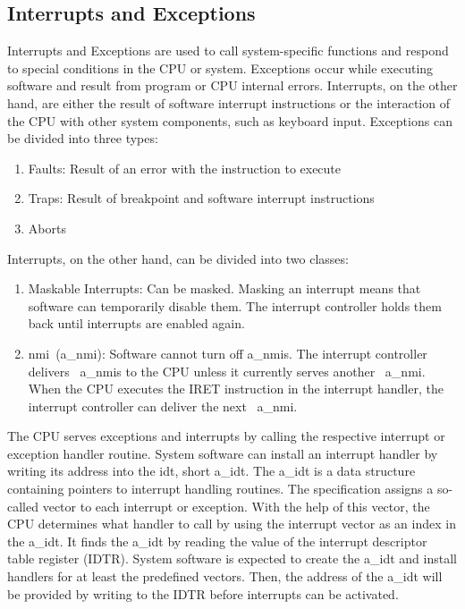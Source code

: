 \subsection{Interrupts and Exceptions}
\label{sec:state:technical:interrupts}
Interrupts and Exceptions are used to call system-specific functions and respond
to special conditions in the CPU or system. Exceptions occur while executing
software and result from program or CPU internal errors. Interrupts, on the
other hand, are either the result of software interrupt instructions or the
interaction of the CPU with other system components, such as keyboard input.
Exceptions can be divided into three types:
\begin{enumerate}
    \item Faults: Result of an error with the instruction to execute
    \item Traps: Result of breakpoint and software interrupt instructions
    \item Aborts
\end{enumerate}
Interrupts, on the other hand, can be divided into two classes:
\begin{enumerate}
    \item Maskable Interrupts: Can be masked. Masking an interrupt means that
          software can temporarily disable them. The interrupt controller
          holds them back until interrupts are enabled again.
    \item \Gls{nmi}~(\acrshort{a_nmi}): Software cannot
          turn off \acrshort{a_nmi}s. The interrupt controller delivers~
          \acrshort{a_nmi}s to the CPU unless it currently serves another~
          \acrshort{a_nmi}. When the CPU executes the IRET instruction in the
          interrupt handler, the interrupt controller can deliver the next~
          \acrshort{a_nmi}.
\end{enumerate}
The CPU serves exceptions and interrupts by calling the respective interrupt or
exception handler routine. System software can install an interrupt handler by
writing its address into the \gls{idt}, short \acrshort{a_idt}. The
\acrshort{a_idt} is a data structure containing pointers to interrupt handling
routines. The specification assigns a so-called vector to each interrupt or
exception. With the help of this vector, the CPU determines what handler to call
by using the interrupt vector as an index in the \acrshort{a_idt}. It finds the
\acrshort{a_idt} by reading the value of the interrupt descriptor table register
(IDTR). System software is expected to create the \acrshort{a_idt} and install
handlers for at least the predefined vectors. Then, the address of the
\acrshort{a_idt} will be provided by writing to the IDTR before interrupts can
be activated. \\

